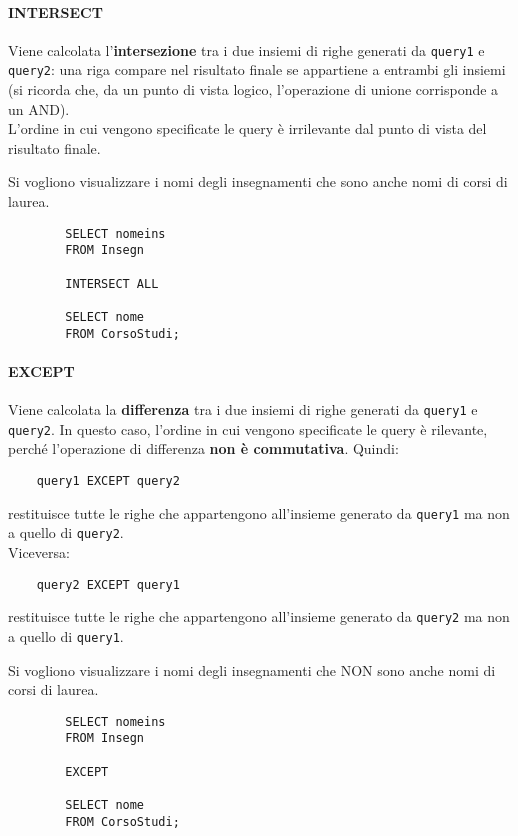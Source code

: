 \documentclass[12pt,a4paper]{book}
\begin{document}
	\paragraph{INTERSECT} Viene calcolata l'\textbf{intersezione} tra i due insiemi di righe generati da \texttt{query1} e \texttt{query2}: una riga compare nel risultato finale se appartiene a entrambi gli insiemi (si ricorda che, da un punto di vista logico, l'operazione di unione corrisponde a un AND).\\L'ordine in cui vengono specificate le query è irrilevante dal punto di vista del risultato finale.\\
	\begin{tcolorbox}[enhanced jigsaw, breakable,title=Esempio, title filled]
		Si vogliono visualizzare i nomi degli insegnamenti che sono anche nomi di corsi di laurea.
		\begin{lstlisting}
		SELECT nomeins 
		FROM Insegn
		
		INTERSECT ALL
		
		SELECT nome
		FROM CorsoStudi;
		\end{lstlisting}
	\end{tcolorbox}
	\paragraph{EXCEPT} Viene calcolata la \textbf{differenza} tra i due insiemi di righe generati da \texttt{query1} e \texttt{query2}. In questo caso, l'ordine in cui vengono specificate le query è rilevante, perché l'operazione di differenza \textbf{non è commutativa}. Quindi:
	\begin{lstlisting}
	query1 EXCEPT query2
	\end{lstlisting}
	restituisce tutte le righe che appartengono all'insieme generato da \texttt{query1} ma non a quello di \texttt{query2}.\\
	Viceversa:
	\begin{lstlisting}
	query2 EXCEPT query1
	\end{lstlisting}
	restituisce tutte le righe che appartengono all'insieme generato da \texttt{query2} ma non a quello di \texttt{query1}.\\
	\begin{tcolorbox}[enhanced jigsaw, breakable,title=Esempio, title filled]
		Si vogliono visualizzare i nomi degli insegnamenti che NON sono anche nomi di corsi di laurea.
		\begin{lstlisting}
		SELECT nomeins 
		FROM Insegn
		
		EXCEPT
		
		SELECT nome
		FROM CorsoStudi;
		\end{lstlisting}
	\end{tcolorbox}
\end{document}
